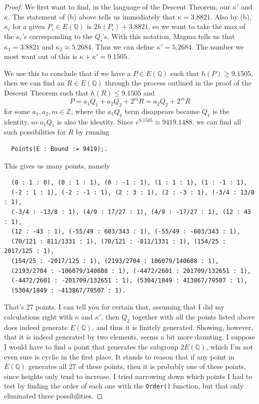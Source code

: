 \documentclass[12pt]{article}
\theoremstyle{definition}
\begin{document}
\begin{proof}
	We first want to find, in the language of the Descent Theorem, our $\kappa'$ and $\kappa$.
	The statement of (b) above tells us immediately that $\kappa = 3.8821$.
	Also by (b), $\kappa_i$ for a given $P_i \in E(\mathbb{Q})$ is $2h(P_i) + 3.8821$, so we want to take the max of the $\kappa_i$'s corresponding to the $Q_i$'s.
	With this notation, Magma tells us that $\kappa_1 = 3.8821$ and $\kappa_2 \approx 5.2684$.
	Thus we can define $\kappa' = 5.2684$.
	The number we most want out of this is $\kappa + \kappa' = 9.1505$.

	We use this to conclude that if we have a $P \in E(\mathbb{Q})$ such that $h(P) \geq 9.1505$, then we can find an $R \in E(\mathbb{Q})$ through the process outlined in the proof of the Descent Theorem such that $h(R) \leq 9.1505$ and
	\begin{equation*}
		P = a_1Q_1 + a_2Q_2 + 2^mR = a_2Q_2 + 2^mR
	\end{equation*}
	for some $a_1, a_2, m \in \mathbb{Z}$, where the $a_1Q_1$ term disappears because $Q_1$ is the identity, so $a_1Q_1$ is also the identity.
	Since $e^{9.1505} \approx 9419.1488$, we can find all such possibilities for $R$ by running \begin{verbatim}
  Points(E : Bound := 9419);.
  \end{verbatim}
	This gives us many points, namely \begin{verbatim}
  (0 : 1 : 0), (0 : 1 : 1), (0 : -1 : 1), (1 : 1 : 1), (1 : -1 : 1),
  (-2 : 1 : 1), (-2 : -1 : 1), (2 : 3 : 1), (2 : -3 : 1), (-3/4 : 13/8 : 1),
  (-3/4 : -13/8 : 1), (4/9 : 17/27 : 1), (4/9 : -17/27 : 1), (12 : 43 : 1),
  (12 : -43 : 1), (-55/49 : 603/343 : 1), (-55/49 : -603/343 : 1),
  (70/121 : 811/1331 : 1), (70/121 : -811/1331 : 1), (154/25 : 2017/125 : 1),
  (154/25 : -2017/125 : 1), (2193/2704 : 106079/140608 : 1),
  (2193/2704 : -106079/140608 : 1), (-4472/2601 : 201709/132651 : 1),
  (-4472/2601 : -201709/132651 : 1), (5304/1849 : 413867/79507 : 1),
  (5304/1849 : -413867/79507 : 1). \end{verbatim}
	That's 27 points.
	I can tell you for certain that, assuming that I did my calculations right with $\kappa$ and $\kappa'$, then $Q_2$ together with all the points listed above does indeed generate $E(\mathbb{Q})$, and thus it is finitely generated.
	Showing, however, that it is indeed generated by two elements, seems a bit more daunting.
	I suppose I would have to find a point that generates the subgroup $2E(\mathbb{Q})$, which I'm not even sure is cyclic in the first place.
	It stands to reason that if any point in $E(\mathbb{Q})$ generates all 27 of these points, then it is probably one of these points, since heights only tend to increase.
	I tried narrowing down which points I had to test by finding the order of each one with the \verb+Order()+ function, but that only eliminated three possibilities.


\end{proof}
\end{document}
